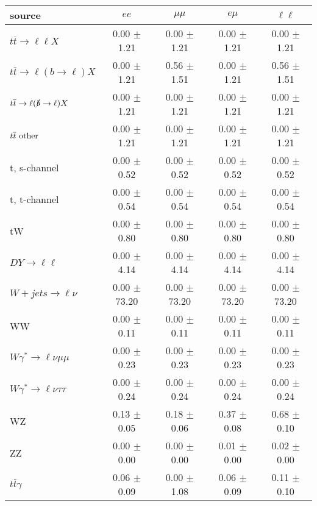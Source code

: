 \begin{tabular}{l|cccc} \hline\hline
source & $ee$ & $\mu\mu$ & $e\mu$ & $\ell\ell $ \\
\hline
$t\overline{t} \rightarrow \ell \ell X$ &  0.00 $\pm$  1.21 &  0.00 $\pm$  1.21 &  0.00 $\pm$  1.21 &  0.00 $\pm$  1.21 \\
$t\overline{t} \rightarrow \ell (b \rightarrow \ell) X$ &  0.00 $\pm$  1.21 &  0.56 $\pm$  1.51 &  0.00 $\pm$  1.21 &  0.56 $\pm$  1.51 \\
$t\overline{t} \rightarrow \ell (\slashed b \rightarrow \ell) X$ &  0.00 $\pm$  1.21 &  0.00 $\pm$  1.21 &  0.00 $\pm$  1.21 &  0.00 $\pm$  1.21 \\
        $t\overline{t}\ \rm{other}$ &  0.00 $\pm$  1.21 &  0.00 $\pm$  1.21 &  0.00 $\pm$  1.21 &  0.00 $\pm$  1.21 \\
\hline
                       t, s-channel &  0.00 $\pm$  0.52 &  0.00 $\pm$  0.52 &  0.00 $\pm$  0.52 &  0.00 $\pm$  0.52 \\
                       t, t-channel &  0.00 $\pm$  0.54 &  0.00 $\pm$  0.54 &  0.00 $\pm$  0.54 &  0.00 $\pm$  0.54 \\
                                 tW &  0.00 $\pm$  0.80 &  0.00 $\pm$  0.80 &  0.00 $\pm$  0.80 &  0.00 $\pm$  0.80 \\
\hline
         $DY \rightarrow \ell \ell$ &  0.00 $\pm$  4.14 &  0.00 $\pm$  4.14 &  0.00 $\pm$  4.14 &  0.00 $\pm$  4.14 \\
      $W+jets \rightarrow \ell \nu$ &  0.00 $\pm$ 73.20 &  0.00 $\pm$ 73.20 &  0.00 $\pm$ 73.20 &  0.00 $\pm$ 73.20 \\
                                 WW &  0.00 $\pm$  0.11 &  0.00 $\pm$  0.11 &  0.00 $\pm$  0.11 &  0.00 $\pm$  0.11 \\
\hline
$W\gamma^{*} \rightarrow \ell \nu \mu\mu$ &  0.00 $\pm$  0.23 &  0.00 $\pm$  0.23 &  0.00 $\pm$  0.23 &  0.00 $\pm$  0.23 \\
$W\gamma^{*} \rightarrow \ell \nu \tau\tau$ &  0.00 $\pm$  0.24 &  0.00 $\pm$  0.24 &  0.00 $\pm$  0.24 &  0.00 $\pm$  0.24 \\
                                 WZ &  0.13 $\pm$  0.05 &  0.18 $\pm$  0.06 &  0.37 $\pm$  0.08 &  0.68 $\pm$  0.10 \\
                                 ZZ &  0.00 $\pm$  0.00 &  0.00 $\pm$  0.00 &  0.01 $\pm$  0.00 &  0.02 $\pm$  0.00 \\
\hline
              $t\overline{t}\gamma$ &  0.06 $\pm$  0.09 &  0.00 $\pm$  1.08 &  0.06 $\pm$  0.09 &  0.11 $\pm$  0.10 \\

\end{tabular}
